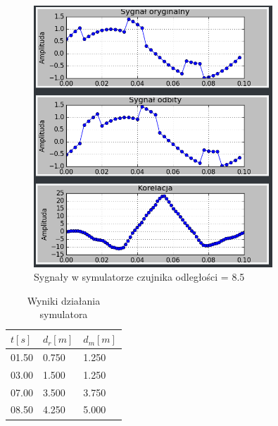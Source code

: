 \documentclass{article}
\begin{document}
{{\begin{figure}[h!]
            \end{figure}
            \begin{figure}[h!]
                \centering
                \includegraphics[width=0.8\textwidth]{img/sim12.png}
                \caption{Sygnały w symulatorze czujnika odległości = 8.5}
            \end{figure}
            \FloatBarrier
            \begin{table}[h!]
                \centering
                \begin{tabular}{|l|l|l|}
                    \hline
                    $t[s]$ & $d_r[m]$ & $d_m[m]$ \\ \hline
                    01.50  & 0.750    & 1.250    \\ \hline
                    03.00  & 1.500    & 1.250    \\ \hline
                    07.00  & 3.500    & 3.750    \\ \hline
                    08.50  & 4.250    & 5.000    \\ \hline
                \end{tabular}
                \caption{Wyniki działania symulatora}
            \end{table}
        }
        \newpage

}
\end{document}
